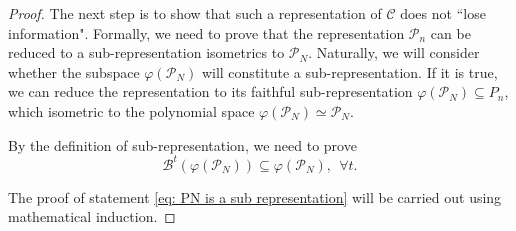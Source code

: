 \documentclass[showpacs,onecolumn,aps,prx,long bibliography,superscriptaddress,notitlepage]{revtex4-1}
\begin{document}
\begin{proof}
    The next step is to show that such a representation of $\mathcal{C}$ does not ``lose information". Formally, we need to prove that the representation $\mathcal{P}_n$ can be reduced to a sub-representation isometrics to $\mathcal{P}_N$. Naturally, we will consider whether the subspace $\varphi(\mathcal{P}_N) $ will constitute a sub-representation. If it is true, we can reduce the representation to its faithful sub-representation $\varphi(\mathcal{P}_N)\subseteq{P}_n $, which isometric to the polynomial space $\varphi(\mathcal{P}_N) \simeq \mathcal{P}_N$.
    

    By the definition of sub-representation, we need to prove
    \begin{equation}
    \label{eq: PN is a sub representation}
         \mathcal{B}^t (\varphi(\mathcal{P}_N)) \subseteq \varphi(\mathcal{P}_N), ~~\forall t .
    \end{equation}

     The proof of statement \eqref{eq: PN is a sub representation} will be carried out using mathematical induction.
    

\end{proof}
\end{document}
